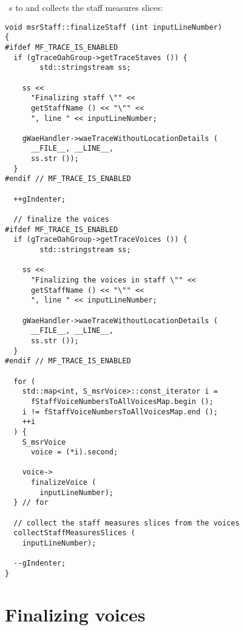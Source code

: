  \cascade\ s to  and collects the staff measures slices:
\begin{lstlisting}[language=CPlusPlus]
void msrStaff::finalizeStaff (int inputLineNumber)
{
#ifdef MF_TRACE_IS_ENABLED
  if (gTraceOahGroup->getTraceStaves ()) {
		std::stringstream ss;

    ss <<
      "Finalizing staff \"" <<
      getStaffName () << "\"" <<
      ", line " << inputLineNumber;

    gWaeHandler->waeTraceWithoutLocationDetails (
      __FILE__, __LINE__,
      ss.str ());
  }
#endif // MF_TRACE_IS_ENABLED

  ++gIndenter;

  // finalize the voices
#ifdef MF_TRACE_IS_ENABLED
  if (gTraceOahGroup->getTraceVoices ()) {
		std::stringstream ss;

    ss <<
      "Finalizing the voices in staff \"" <<
      getStaffName () << "\"" <<
      ", line " << inputLineNumber;

    gWaeHandler->waeTraceWithoutLocationDetails (
      __FILE__, __LINE__,
      ss.str ());
  }
#endif // MF_TRACE_IS_ENABLED

  for (
    std::map<int, S_msrVoice>::const_iterator i =
      fStaffVoiceNumbersToAllVoicesMap.begin ();
    i != fStaffVoiceNumbersToAllVoicesMap.end ();
    ++i
  ) {
    S_msrVoice
      voice = (*i).second;

    voice->
      finalizeVoice (
        inputLineNumber);
  } // for

  // collect the staff measures slices from the voices
  collectStaffMeasuresSlices (
    inputLineNumber);

  --gIndenter;
}
\end{lstlisting}


\section{Finalizing voices}


